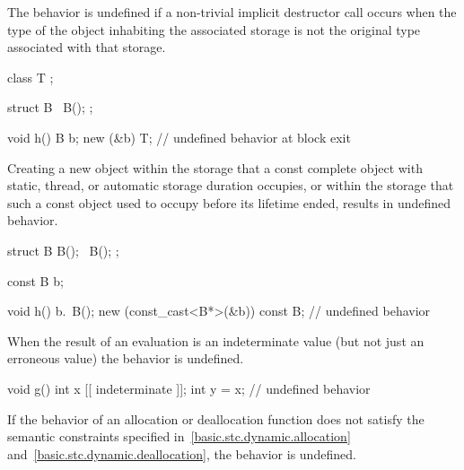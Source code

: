 
\pnum
The behavior is undefined if
a non-trivial implicit destructor call
occurs when the type of the object inhabiting the associated storage
is not the original type associated with that storage.

\pnum
\begin{example}
\begin{codeblock}
class T {};

struct B {
  ~B();
};

void h() {
  B b;
  new (&b) T;
}               // undefined behavior at block exit
\end{codeblock}
\end{example}


\pnum
Creating a new object within the storage that a const complete object
with static, thread, or automatic storage duration occupies,
or within the storage that such a const object used to occupy
before its lifetime ended, results in undefined behavior.

\pnum
\begin{example}
\begin{codeblock}
struct B {
  B();
  ~B();
};

const B b;

void h() {
  b.~B();
  new (const_cast<B*>(&b)) const B; // undefined behavior
}
\end{codeblock}
\end{example}


\pnum
When the result of an evaluation is an indeterminate value
(but not just an erroneous value) the behavior is undefined.

\pnum
\begin{example}
\begin{codeblock}
void g() {
  int x [[ indeterminate ]];
  int y = x;    // undefined behavior
}
\end{codeblock}
\end{example}


\pnum
If the behavior of an allocation or deallocation function
does not satisfy the semantic constraints specified
in~\ref{basic.stc.dynamic.allocation}
and~\ref{basic.stc.dynamic.deallocation},
the behavior is undefined.

